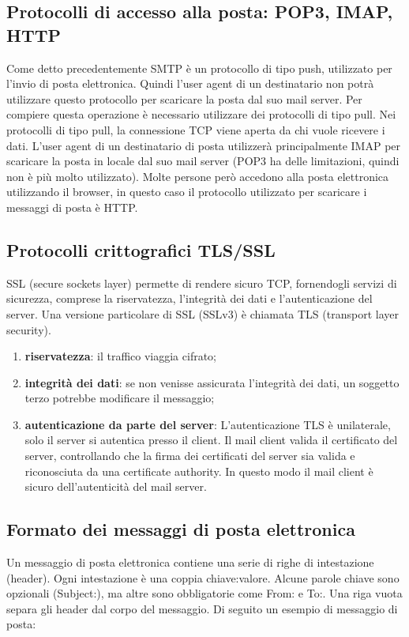 \subsection{Protocolli di accesso alla posta: POP3, IMAP, HTTP}
Come detto precedentemente SMTP è un protocollo di tipo push, utilizzato per l’invio di posta elettronica. 
Quindi l’user agent di un destinatario non potrà utilizzare questo protocollo per scaricare la posta dal suo mail 
server. Per compiere questa operazione è necessario utilizzare dei protocolli di tipo pull. 
Nei protocolli di tipo pull, la connessione TCP viene aperta da chi vuole ricevere i dati.
L’user agent di un destinatario di posta utilizzerà principalmente IMAP per scaricare la posta in locale dal suo mail server 
(POP3 ha delle limitazioni, quindi non è più molto utilizzato). 
Molte persone però accedono alla posta elettronica utilizzando il browser, in questo caso il protocollo utilizzato 
per scaricare i messaggi di posta è HTTP.

\subsection{Protocolli crittografici TLS/SSL}
SSL (secure sockets layer) permette di rendere sicuro TCP,  fornendogli servizi di sicurezza, 
comprese la riservatezza, l’integrità dei dati e l’autenticazione del server. 
Una versione particolare di SSL (SSLv3) è chiamata TLS (transport layer security).\cite{tls}

\begin{enumerate}
    \item \textbf{riservatezza}: il traffico viaggia cifrato;
    \item \textbf{integrità dei dati}: se non venisse assicurata l'integrità dei dati, un soggetto terzo
    potrebbe modificare il messaggio;
    \item \textbf{autenticazione da parte del server}: L'autenticazione TLS è unilaterale, solo il server si 
    autentica presso il client. Il mail client valida il certificato del server, controllando che la firma dei 
    certificati del server sia valida e riconosciuta da una certificate authority.
    In questo modo il mail client è sicuro dell'autenticità del mail server. 
\end{enumerate}


\subsection{Formato dei messaggi di posta elettronica}
Un messaggio di posta elettronica contiene una serie di righe di intestazione (header).
Ogni intestazione è una coppia chiave:valore. Alcune parole chiave sono opzionali (Subject:), 
ma altre sono obbligatorie come From: e To:. Una riga vuota separa gli header dal corpo del messaggio.
Di seguito un esempio di messaggio di posta:

